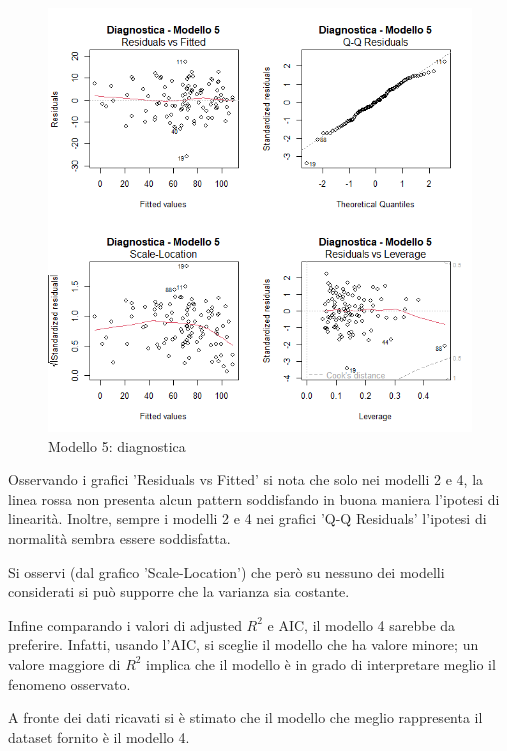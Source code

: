 \begin{figure}[H]
	\centering
	\includegraphics[width=0.75\linewidth]{../graphs/diagnostica/modello5}
	\caption{Modello 5: diagnostica}
	\label{fig:diagnostica_modello5}
\end{figure}

Osservando i grafici 'Residuals vs Fitted' si nota che solo nei modelli 2 e 4, la linea rossa non presenta alcun pattern soddisfando in buona maniera l'ipotesi di linearità. Inoltre, sempre i modelli 2 e 4 nei grafici 'Q-Q Residuals' l'ipotesi di normalità sembra essere soddisfatta. 

Si osservi (dal grafico 'Scale-Location') che però su nessuno dei modelli considerati si può supporre che la varianza sia costante.

Infine comparando i valori di adjusted $R^2$ e AIC, il modello 4 sarebbe da preferire. Infatti, usando l'AIC, si sceglie il modello che ha valore minore; un valore maggiore di $R^2$ implica che il modello è in grado di interpretare meglio il fenomeno osservato.

A fronte dei dati ricavati si è stimato che il modello che meglio rappresenta il dataset fornito è il modello 4.


